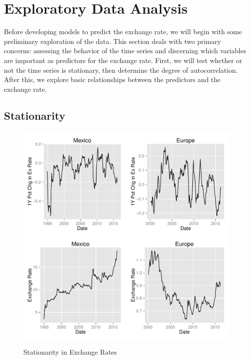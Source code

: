 \documentclass{sig-alternate-05-2015}
\begin{document}
\section{Exploratory Data Analysis}

Before developing models to predict the exchange rate, we will begin with some preliminary exploration of the data. This section deals with two primary concerns: assessing the behavior of the time series and discerning which variables are important as predictors for the exchange rate. First, we will test whether or not the time series is stationary, then determine the degree of autocorrelation. After this, we explore basic relationships between the predictors and the exchange rate.

\subsection{Stationarity}

\begin{figure}
\centering
\caption{Stationarity in Exchange Rates}
\includegraphics[scale=0.45]{stationarity.pdf}
\label{fig:rates_time}
\end{figure}
\end{document}
